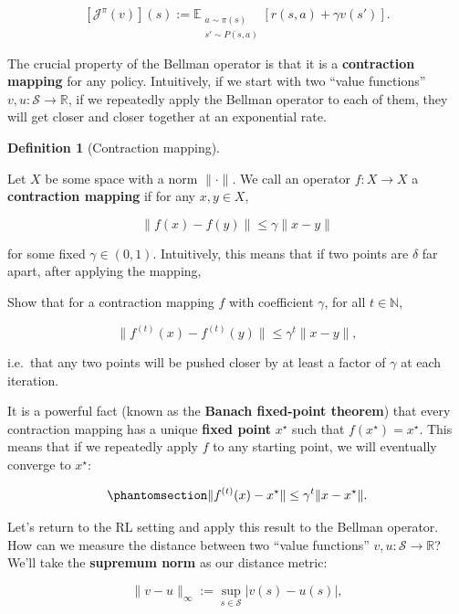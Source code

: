 \documentclass[
  letterpaper,
  DIV=11,
  numbers=noendperiod]{scrreprt}
\theoremstyle{plain}
\theoremstyle{plain}
\theoremstyle{definition}
\theoremstyle{definition}
\newtheorem{definition}{Definition}[chapter]
\theoremstyle{remark}
\begin{document}
\[[\mathcal{J}^{\pi}(v)](s) := \mathbb{E}_{\substack{a \sim \pi(s) \\ s' \sim P(s, a)}} [r(s, a) + \gamma v(s')].\]

The crucial property of the Bellman operator is that it is a
\textbf{contraction mapping} for any policy. Intuitively, if we start
with two ``value functions'' \(v, u : \mathcal{S} \to \mathbb{R}\), if
we repeatedly apply the Bellman operator to each of them, they will get
closer and closer together at an exponential rate.

\begin{definition}[Contraction
mapping]\protect\hypertarget{def-contraction}{}\label{def-contraction}

Let \(X\) be some space with a norm \(\|\cdot\|\). We call an operator
\(f: X \to X\) a \textbf{contraction mapping} if for any \(x, y \in X\),

\[\|f(x) - f(y)\| \le \gamma \|x - y\|\]

for some fixed \(\gamma \in (0, 1)\). Intuitively, this means that if
two points are \(\delta\) far apart, after applying the mapping,

\end{definition}

Show that for a contraction mapping \(f\) with coefficient \(\gamma\),
for all \(t \in \mathbb{N}\),

\[\|f^{(t)}(x) - f^{(t)}(y)\| \le \gamma^t \|x - y\|,\]

i.e.~that any two points will be pushed closer by at least a factor of
\(\gamma\) at each iteration.

It is a powerful fact (known as the \textbf{Banach fixed-point theorem})
that every contraction mapping has a unique \textbf{fixed point}
\(x^\star\) such that \(f(x^\star) = x^\star\). This means that if we
repeatedly apply \(f\) to any starting point, we will eventually
converge to \(x^\star\):

\begin{equation}\phantomsection\label{eq-contraction_convergence}{
\|f^{(t)}(x) - x^\star\| \le \gamma^t \|x - x^\star\|.
}\end{equation}

Let's return to the RL setting and apply this result to the Bellman
operator. How can we measure the distance between two ``value
functions'' \(v, u : \mathcal{S} \to \mathbb{R}\)? We'll take the
\textbf{supremum norm} as our distance metric:

\[\| v - u \|_{\infty} := \sup_{s \in \mathcal{S}} |v(s) - u(s)|,\]
\end{document}
